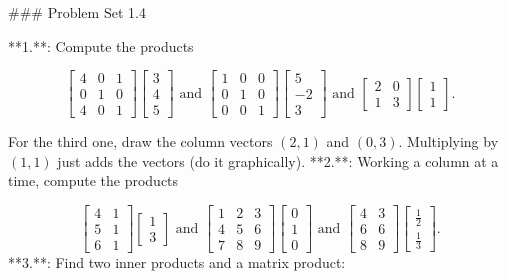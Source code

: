 

### Problem Set 1.4

**1.**: Compute the products

\[\begin{bmatrix}4&0&1\\ 0&1&0\\ 4&0&1\end{bmatrix}\begin{bmatrix}3\\ 4\\ 5\end{bmatrix}\text{ and }\begin{bmatrix}1&0&0\\ 0&1&0\\ 0&0&1\end{bmatrix}\begin{bmatrix}5\\ -2\\ 3\end{bmatrix}\text{ and }\begin{bmatrix}2&0\\ 1&3\end{bmatrix}\begin{bmatrix}1\\ 1\end{bmatrix}.\]

For the third one, draw the column vectors \((2,1)\) and \((0,3)\). Multiplying by \((1,1)\) just adds the vectors (do it graphically).
**2.**: Working a column at a time, compute the products

\[\begin{bmatrix}4&1\\ 5&1\\ 6&1\end{bmatrix}\begin{bmatrix}1\\ 3\end{bmatrix}\text{ and }\begin{bmatrix}1&2&3\\ 4&5&6\\ 7&8&9\end{bmatrix}\begin{bmatrix}0\\ 1\\ 0\end{bmatrix}\text{ and }\begin{bmatrix}4&3\\ 6&6\\ 8&9\end{bmatrix}\begin{bmatrix}\frac{1}{2}\\ \frac{1}{3}\end{bmatrix}.\]
**3.**: Find two inner products and a matrix product:

